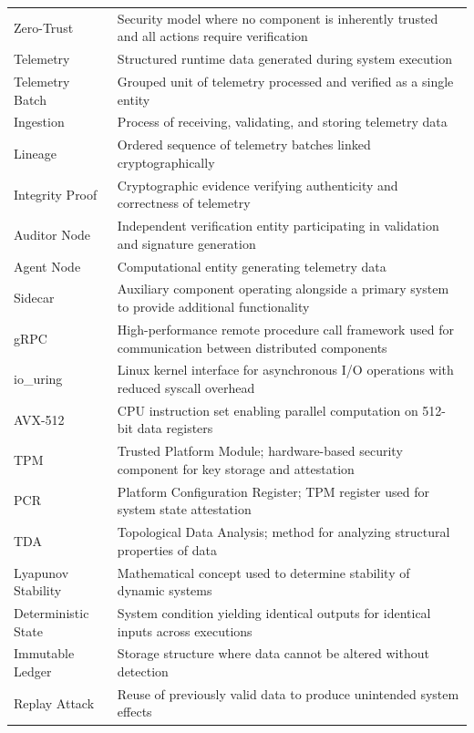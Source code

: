 \begin{longtable}{p{4cm} p{10cm}}
Zero-Trust & Security model where no component is inherently trusted and all actions require verification \\

Telemetry & Structured runtime data generated during system execution \\

Telemetry Batch & Grouped unit of telemetry processed and verified as a single entity \\

Ingestion & Process of receiving, validating, and storing telemetry data \\

Lineage & Ordered sequence of telemetry batches linked cryptographically \\

Integrity Proof & Cryptographic evidence verifying authenticity and correctness of telemetry \\

Auditor Node & Independent verification entity participating in validation and signature generation \\

Agent Node & Computational entity generating telemetry data \\

Sidecar & Auxiliary component operating alongside a primary system to provide additional functionality \\

gRPC & High-performance remote procedure call framework used for communication between distributed components \\

io\_uring & Linux kernel interface for asynchronous I/O operations with reduced syscall overhead \\

AVX-512 & CPU instruction set enabling parallel computation on 512-bit data registers \\

TPM & Trusted Platform Module; hardware-based security component for key storage and attestation \\

PCR & Platform Configuration Register; TPM register used for system state attestation \\

TDA & Topological Data Analysis; method for analyzing structural properties of data \\

Lyapunov Stability & Mathematical concept used to determine stability of dynamic systems \\

Deterministic State & System condition yielding identical outputs for identical inputs across executions \\

Immutable Ledger & Storage structure where data cannot be altered without detection \\

Replay Attack & Reuse of previously valid data to produce unintended system effects \\

\end{longtable}